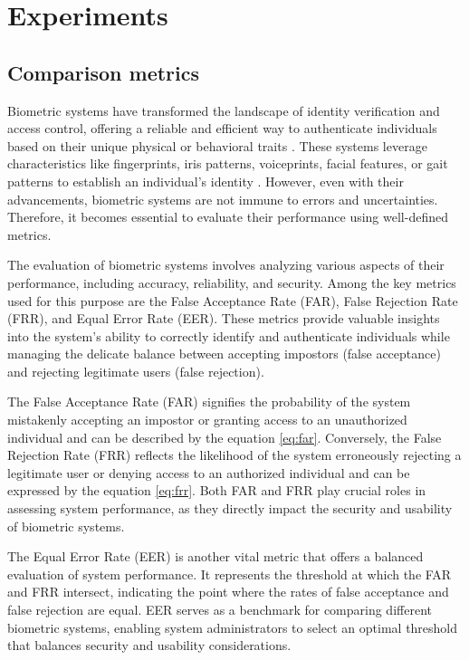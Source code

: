 \section{Experiments}

\subsection{Comparison metrics}

Biometric systems have transformed the landscape of identity verification and access control, offering a reliable and efficient way to authenticate individuals based on their unique physical or behavioral traits \cite{jain2007handbook}. These systems leverage characteristics like fingerprints, iris patterns, voiceprints, facial features, or gait patterns to establish an individual's identity \cite{bolle2013guide}. However, even with their advancements, biometric systems are not immune to errors and uncertainties. Therefore, it becomes essential to evaluate their performance using well-defined metrics.

The evaluation of biometric systems involves analyzing various aspects of their performance, including accuracy, reliability, and security. Among the key metrics used for this purpose are the False Acceptance Rate (FAR), False Rejection Rate (FRR), and Equal Error Rate (EER)\cite{benchmarks}. These metrics provide valuable insights into the system's ability to correctly identify and authenticate individuals while managing the delicate balance between accepting impostors (false acceptance) and rejecting legitimate users (false rejection).

The False Acceptance Rate (FAR) signifies the probability of the system mistakenly accepting an impostor or granting access to an unauthorized individual and can be described by the equation \ref{eq:far}. Conversely, the False Rejection Rate (FRR) reflects the likelihood of the system erroneously rejecting a legitimate user or denying access to an authorized individual and can be expressed by the equation \ref{eq:frr}. Both FAR and FRR play crucial roles in assessing system performance, as they directly impact the security and usability of biometric systems.

The Equal Error Rate (EER) is another vital metric that offers a balanced evaluation of system performance. It represents the threshold at which the FAR and FRR intersect, indicating the point where the rates of false acceptance and false rejection are equal. EER serves as a benchmark for comparing different biometric systems, enabling system administrators to select an optimal threshold that balances security and usability considerations\cite{benchmarks}.


